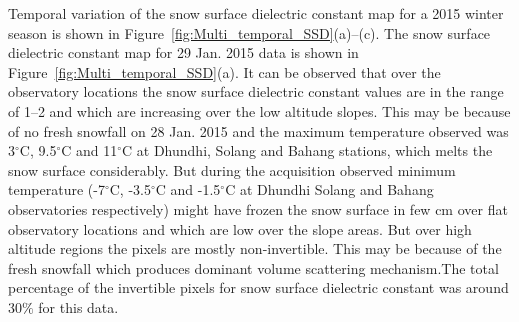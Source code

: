 Temporal variation of the snow surface dielectric constant map for a 2015 winter season is shown in Figure~\ref{fig:Multi_temporal_SSD}(a)--(c). The snow surface dielectric constant map for 29 Jan. 2015 data is shown in Figure~\ref{fig:Multi_temporal_SSD}(a). It can be observed that over the observatory locations the snow surface dielectric constant values are in the range of 1--2 and which are increasing over the low altitude slopes. This may be because of no fresh snowfall on 28 Jan. 2015 and the maximum temperature observed was 3$^\circ$C, 9.5$^\circ$C and 11$^\circ$C at Dhundhi, Solang and Bahang stations, which melts the snow surface considerably. But during the acquisition observed minimum temperature (-7$^\circ$C, -3.5$^\circ$C and -1.5$^\circ$C at Dhundhi Solang and Bahang observatories respectively) might have frozen the snow surface in few cm over flat observatory locations and which are low over the slope areas. But over high altitude regions the pixels are mostly non-invertible. This may be because of the fresh snowfall which produces dominant volume scattering mechanism.The total percentage of the invertible pixels for snow surface dielectric constant was around 30$\%$ for this data.  
